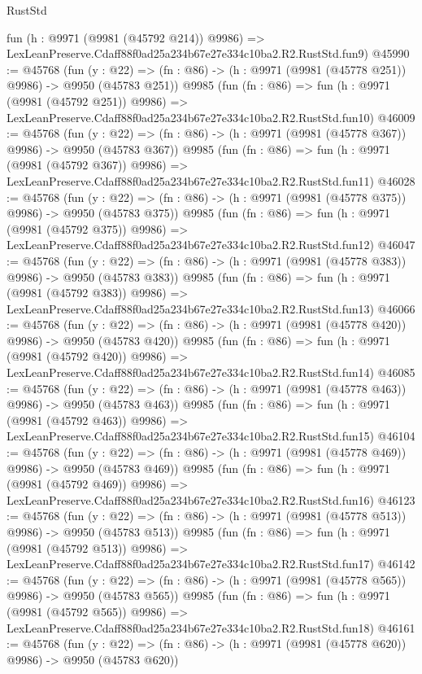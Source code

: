\begin{lexlean}{RustStd}
\begin{coremodule}
    fun (h : @9971 (@9981 (@45792 @214)) @9986) =>
    LexLeanPreserve.Cdaff88f0ad25a234b67e27e334c10ba2.R2.RustStd.fun9)
@45990 := @45768
    (fun (y : @22) => (fn : @86) -> (h : @9971 (@9981 (@45778 @251)) @9986) -> @9950 (@45783 @251))
    @9985
    (fun (fn : @86) =>
    fun (h : @9971 (@9981 (@45792 @251)) @9986) =>
    LexLeanPreserve.Cdaff88f0ad25a234b67e27e334c10ba2.R2.RustStd.fun10)
@46009 := @45768
    (fun (y : @22) => (fn : @86) -> (h : @9971 (@9981 (@45778 @367)) @9986) -> @9950 (@45783 @367))
    @9985
    (fun (fn : @86) =>
    fun (h : @9971 (@9981 (@45792 @367)) @9986) =>
    LexLeanPreserve.Cdaff88f0ad25a234b67e27e334c10ba2.R2.RustStd.fun11)
@46028 := @45768
    (fun (y : @22) => (fn : @86) -> (h : @9971 (@9981 (@45778 @375)) @9986) -> @9950 (@45783 @375))
    @9985
    (fun (fn : @86) =>
    fun (h : @9971 (@9981 (@45792 @375)) @9986) =>
    LexLeanPreserve.Cdaff88f0ad25a234b67e27e334c10ba2.R2.RustStd.fun12)
@46047 := @45768
    (fun (y : @22) => (fn : @86) -> (h : @9971 (@9981 (@45778 @383)) @9986) -> @9950 (@45783 @383))
    @9985
    (fun (fn : @86) =>
    fun (h : @9971 (@9981 (@45792 @383)) @9986) =>
    LexLeanPreserve.Cdaff88f0ad25a234b67e27e334c10ba2.R2.RustStd.fun13)
@46066 := @45768
    (fun (y : @22) => (fn : @86) -> (h : @9971 (@9981 (@45778 @420)) @9986) -> @9950 (@45783 @420))
    @9985
    (fun (fn : @86) =>
    fun (h : @9971 (@9981 (@45792 @420)) @9986) =>
    LexLeanPreserve.Cdaff88f0ad25a234b67e27e334c10ba2.R2.RustStd.fun14)
@46085 := @45768
    (fun (y : @22) => (fn : @86) -> (h : @9971 (@9981 (@45778 @463)) @9986) -> @9950 (@45783 @463))
    @9985
    (fun (fn : @86) =>
    fun (h : @9971 (@9981 (@45792 @463)) @9986) =>
    LexLeanPreserve.Cdaff88f0ad25a234b67e27e334c10ba2.R2.RustStd.fun15)
@46104 := @45768
    (fun (y : @22) => (fn : @86) -> (h : @9971 (@9981 (@45778 @469)) @9986) -> @9950 (@45783 @469))
    @9985
    (fun (fn : @86) =>
    fun (h : @9971 (@9981 (@45792 @469)) @9986) =>
    LexLeanPreserve.Cdaff88f0ad25a234b67e27e334c10ba2.R2.RustStd.fun16)
@46123 := @45768
    (fun (y : @22) => (fn : @86) -> (h : @9971 (@9981 (@45778 @513)) @9986) -> @9950 (@45783 @513))
    @9985
    (fun (fn : @86) =>
    fun (h : @9971 (@9981 (@45792 @513)) @9986) =>
    LexLeanPreserve.Cdaff88f0ad25a234b67e27e334c10ba2.R2.RustStd.fun17)
@46142 := @45768
    (fun (y : @22) => (fn : @86) -> (h : @9971 (@9981 (@45778 @565)) @9986) -> @9950 (@45783 @565))
    @9985
    (fun (fn : @86) =>
    fun (h : @9971 (@9981 (@45792 @565)) @9986) =>
    LexLeanPreserve.Cdaff88f0ad25a234b67e27e334c10ba2.R2.RustStd.fun18)
@46161 := @45768
    (fun (y : @22) => (fn : @86) -> (h : @9971 (@9981 (@45778 @620)) @9986) -> @9950 (@45783 @620))

\end{coremodule}
\end{lexlean}
